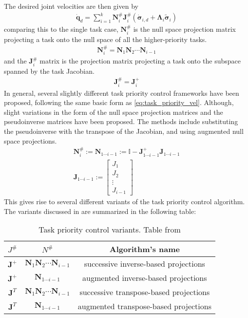 The desired joint velocities are then given by
\begin{align}
    \dot{\bm{q}}_d = \sum_{i=1}^k \bm{N}_i^{\#}\bm{J}_i^{\#} \left(\dot{\bm{\sigma}}_{i,d} + \bm{\Lambda}_i \tilde{\bm{\sigma}}_i\right) \label{eq:task_priority_vel}
\end{align}
comparing this to the single task case, $\bm{N}_i^{\#}$ is the null space projection matrix
projecting a task onto the null space of all the higher-priority tasks.
\begin{align}
    \bm{N}_i^{\#} = \bm{N}_1 \bm{N}_2 \cdots \bm{N}_{i-1}
\end{align}
and the $\bm{J}_i^{\#}$ matrix is the projection matrix projecting a task onto the
subspace spanned by the task Jacobian.
\begin{align}
    \bm{J}_i^{\#} = \bm{J}_i^+
\end{align}
In general, several slightly different task priority control frameworks have
been proposed, following the same basic form as \autoref{eq:task_priority_vel}.
Although, slight variations in the form of the null space projection matrices
and the pseudoinverse matrices have been proposed. The methods include substituting
the pseudoinverse with the transpose of the Jacobian, and using augmented null space
projections.
\begin{subequations}
\begin{align}
    \bm{N}_i^{\#} := \bm{N}_{1\cdots i-1} := \mathbb{I} - \bm{J}_{1\cdots i-1}^+ \bm{J}_{1\cdots i-1} \\
    \bm{J}_{1\cdots i-1} := \begin{bmatrix}
        J_1 \\
        J_2 \\
        \vdots \\
        J_{i-1}
    \end{bmatrix}
\end{align}
\end{subequations}
This gives rise to several different variants of the task priority control algorithm.
The variants discussed in \cite{antonelli2009} are summarized in the following table:
\begin{table}[h]
    \centering
    \begin{tabular}{|c|c|c|}
        \hline
        $J^{\#}$ & $N^{\#}$ & Algorithm's name \\
        \hline
        $\bm{J}^+$ & $\bm{N}_1 \bm{N}_2 \cdots \bm{N}_{i-1}$ & successive inverse-based projections \\
        $\bm{J}^+$ & $\bm{N}_{1\cdots i-1}$ & augmented inverse-based projections \\
        $\bm{J}^T$ & $\bm{N}_1 \bm{N}_2 \cdots \bm{N}_{i-1}$ & successive transpose-based projections \\
        $\bm{J}^T$ & $\bm{N}_{1\cdots i-1}$ & augmented transpose-based projections \\
        \hline
    \end{tabular}
    \label{tab:tpc_variants}
    \caption{Task priority control variants. Table from \cite{antonelli2009}}
\end{table}


